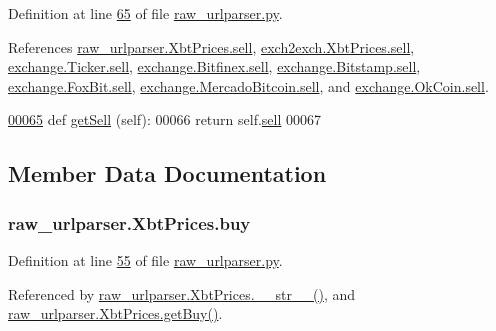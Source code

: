 Definition at line \hyperlink{raw__urlparser_8py_source_l00065}{65} of file \hyperlink{raw__urlparser_8py_source}{raw\+\_\+urlparser.\+py}.



References \hyperlink{raw__urlparser_8py_source_l00054}{raw\+\_\+urlparser.\+Xbt\+Prices.\+sell}, \hyperlink{exch2exch_8py_source_l00058}{exch2exch.\+Xbt\+Prices.\+sell}, \hyperlink{exchange_8py_source_l00059}{exchange.\+Ticker.\+sell}, \hyperlink{exchange_8py_source_l00324}{exchange.\+Bitfinex.\+sell}, \hyperlink{exchange_8py_source_l00393}{exchange.\+Bitstamp.\+sell}, \hyperlink{exchange_8py_source_l00465}{exchange.\+Fox\+Bit.\+sell}, \hyperlink{exchange_8py_source_l00527}{exchange.\+Mercado\+Bitcoin.\+sell}, and \hyperlink{exchange_8py_source_l00592}{exchange.\+Ok\+Coin.\+sell}.


\begin{DoxyCode}
\hypertarget{classraw__urlparser_1_1_xbt_prices.tex_l00065}{}\hyperlink{classraw__urlparser_1_1_xbt_prices_a1a1d7e7b76f611ae334b0950b334dda1}{00065}     \textcolor{keyword}{def }\hyperlink{classraw__urlparser_1_1_xbt_prices_a1a1d7e7b76f611ae334b0950b334dda1}{getSell} (self):
00066         \textcolor{keywordflow}{return} self.\hyperlink{classraw__urlparser_1_1_xbt_prices_a22b483cac27a5b17f9e7b265c219bb99}{sell}
00067         
\end{DoxyCode}


\subsection{Member Data Documentation}
\subsubsection[{\texorpdfstring{buy}{buy}}]{\setlength{\rightskip}{0pt plus 5cm}raw\+\_\+urlparser.\+Xbt\+Prices.\+buy}\hypertarget{classraw__urlparser_1_1_xbt_prices_a87eba659d6598ffd66c694535e1b7a7a}{}\label{classraw__urlparser_1_1_xbt_prices_a87eba659d6598ffd66c694535e1b7a7a}


Definition at line \hyperlink{raw__urlparser_8py_source_l00055}{55} of file \hyperlink{raw__urlparser_8py_source}{raw\+\_\+urlparser.\+py}.



Referenced by \hyperlink{raw__urlparser_8py_source_l00074}{raw\+\_\+urlparser.\+Xbt\+Prices.\+\_\+\+\_\+str\+\_\+\+\_\+()}, and \hyperlink{raw__urlparser_8py_source_l00062}{raw\+\_\+urlparser.\+Xbt\+Prices.\+get\+Buy()}.

